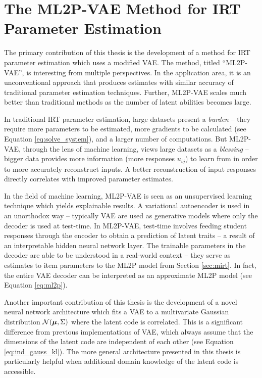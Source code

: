 \chapter{The ML2P-VAE Method for IRT Parameter Estimation}\label{ch:ml2pvae_methods}
The primary contribution of this thesis is the development of a method for IRT parameter estimation which uses a modified VAE. The method, titled ``ML2P-VAE'', is interesting from multiple perspectives. In the application area, it is an unconventional approach that produces estimates with similar accuracy of traditional parameter estimation techniques. Further, ML2P-VAE scales much better than traditional methods as the number of latent abilities becomes large. 

In traditional IRT parameter estimation, large datasets present a \textit{burden} -- they require more parameters to be estimated, more gradients to be calculated (see Equation \ref{eq:solve_system}), and a larger number of computations. But ML2P-VAE, through the lens of machine learning, views large datasets as a \textit{blessing} -- bigger data provides more information (more responses $u_{ij}$) to learn from in order to more accurately reconstruct inputs. A better reconstruction of input responses directly correlates with improved parameter estimates.

In the field of machine learning, ML2P-VAE is seen as an unsupervised learning technique which yields explainable results. A variational autoencoder is used in an unorthodox way -- typically VAE are used as generative models where only the decoder is used at test-time. In ML2P-VAE, test-time involves feeding student responses through the encoder to obtain a prediction of latent traits -- a result of an interpretable hidden neural network layer. The trainable parameters in the decoder are able to be understood in a real-world context -- they serve as estimates to item parameters to the ML2P model from Section \ref{sec:mirt}. In fact, the entire VAE decoder can be interpreted as an approximate ML2P model (see Equation \ref{eq:ml2p}).

Another important contribution of this thesis is the development of a novel neural network architecture which fits a VAE to a multivariate Gaussian distribution $\mathcal{N}(\boldsymbol{\mu}, \Sigma)$ where the latent code is correlated. This is a significant difference from previous implementations of VAE, which always assume that the dimensions of the latent code are independent of each other (see Equation \ref{eq:ind_gauss_kl}). The more general architecture presented in this thesis is particularly helpful when additional domain knowledge of the latent code is accessible.

